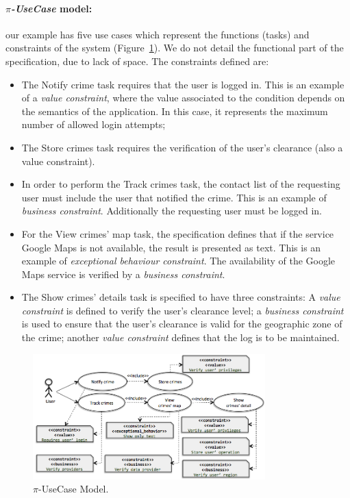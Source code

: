 \paragraph*{\textit{$\pi$-UseCase} model:} 
our example has five use cases which represent the
 functions (tasks) and constraints of the system (Figure~\ref{fig:piUC}). 
We do not detail the functional part of the specification, due to lack of space.
The constraints defined are: 
\begin{itemize}
  \item The \textsf{Notify crime} task requires that the user is logged in. 
  This is an example of a \textit{value constraint}, where the value associated to the condition depends on the semantics of the application.
  In this case, it represents the maximum number of allowed login attempts;
\item The \textsf{Store crimes} task requires the verification of the user's clearance (also a value constraint). 
\item In order to perform the \textsf{Track crimes} task,
the contact list of the requesting user must include the user that notified the crime.
This is an example of \textit{business constraint}.
Additionally the requesting user must be logged in.
\item  For the \textsf{View crimes' map} task, the specification defines that if the service \textsf{Google Maps}  is not available, the result is presented as text. This is an example of \textit{exceptional behaviour constraint}. 
The availability of the \textsf{Google Maps} service is verified by a \textit{business constraint}.
 \item The \textsf{Show crimes' details} task is specified to have three constraints: A \textit{value constraint} is defined to verify the user's clearance level; a \textit{business constraint} is used to ensure that the user's clearance is valid for the geographic zone of the crime; another \textit{value constraint} defines that the log is to be maintained.
\end{itemize}
\begin{figure}[t]
\centering
\includegraphics[width=0.8\textwidth]{figs/piUseCase}
\caption{$\pi$-UseCase Model.}
\label{fig:piUC}
\end{figure}


